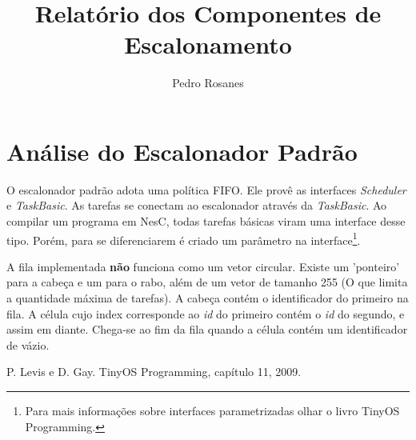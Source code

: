 \documentclass[a4paper,onecolumn, 10pt]{article}
\title{Relatório dos Componentes de Escalonamento}
\author{Pedro Rosanes}
\begin{document}
\maketitle





\section{Análise do Escalonador Padrão}\label{escalonadorpadrao}

O escalonador padrão adota uma política FIFO. Ele provê as interfaces \textit{Scheduler} e \textit{TaskBasic}. As tarefas se conectam ao escalonador através da \textit{TaskBasic}. Ao compilar um programa em NesC, todas tarefas básicas viram uma interface desse tipo. Porém, para se diferenciarem é criado um parâmetro na interface\footnote{Para mais informações sobre interfaces parametrizadas olhar o livro TinyOS Programming\cite[s. 8.3 e 9]{tinyosprogramming}.}.

A fila implementada \textbf{não} funciona como um vetor circular. Existe um 'ponteiro' para a cabeça e um para o rabo, além de um vetor de tamanho 255 (O que limita a quantidade máxima de tarefas). A cabeça contém o identificador do primeiro na fila. A célula cujo index corresponde ao \textit{id} do primeiro contém o \textit{id} do segundo, e assim em diante. Chega-se ao fim da fila quando a célula contém um identificador de vázio.


\pagebreak

\begin{thebibliography}{9}
 P. Levis e D. Gay. TinyOS Programming, capítulo 11, 2009.
\end{thebibliography}
\end{document}
